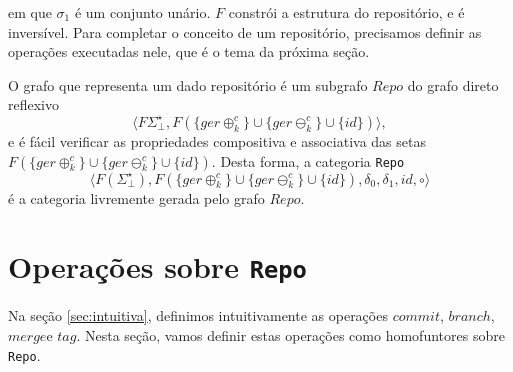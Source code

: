 \documentclass[a4paper]{article}
\newcommand{\co}{{$commit$}}
\newcommand{\branch}{{$branch$}}
\newcommand{\merge}{{$merge$}}
\newcommand{\mytag}{{$tag$}}
\newcommand{\baseset}{{\Sigma^\star_\bot}}
\newcommand{\opa}{{\oplus^c_k}}
\newcommand{\gopa}{{\{ger\opa\}}}
\newcommand{\opb}{{\ominus^c_k}}
\newcommand{\gopb}{{\{ger\opb\}}}
\newcommand{\composition}{{\circ}}
\newcommand{\morun}{{\gopa \cup \gopb \cup \{id\}}}
\newcommand{\repo}{{\langle F(\baseset), F(\morun), \delta_0, \delta_1, id, \composition\rangle}}
\begin{document}
em que $\sigma_1$ é um conjunto unário. $F$ constrói a estrutura do repositório, e é inversível. Para completar o conceito de um repositório, precisamos definir as operações executadas nele, que é o tema da próxima seção.


O grafo que representa um dado repositório é um subgrafo $Repo$ do grafo direto reflexivo 
\[
\langle F\baseset, F(\morun)\rangle,
\]
e é fácil verificar as propriedades compositiva e associativa das setas $F(\morun)$. Desta forma, a categoria {\tt Repo} 
 \[
\repo
\]
é a categoria livremente gerada pelo grafo $Repo$.

\section*{Operações sobre {\tt Repo}}
Na seção \ref{sec:intuitiva}, definimos intuitivamente as operações \co, \branch, \merge e \mytag. Nesta seção, vamos definir estas operações como homofuntores sobre {\tt Repo}.
\end{document}
